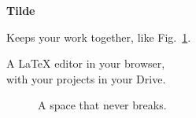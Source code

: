 \documentclass[11pt]{article}
\begin{document}
\begin{center}
  {\huge\bfseries Tilde}\par\medskip
  {\large Keeps your work together,
  like Fig.~\ref{fig:tie}.}\par\bigskip
  A LaTeX editor in your browser,\\
  with your projects in your Drive.
\end{center}

\begin{figure}[h]
  \centering
  \caption{A space that never breaks.}
  \label{fig:tie}
\end{figure}
\end{document}
